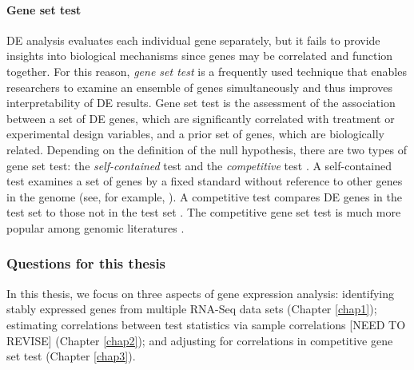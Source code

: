 \paragraph*{Gene set test}
DE analysis evaluates each individual gene separately, but it fails to provide insights into
biological mechanisms since genes may be correlated and function together. %
For this reason, \textit{gene set test} is a frequently used technique that enables
researchers to examine an ensemble of genes simultaneously and thus improves interpretability of DE
results. Gene set test is the assessment of
the association between a set of DE genes, which are significantly correlated with
treatment or experimental design variables, and a prior set of genes, which are biologically
related. Depending on the definition of the null hypothesis, there are two types of gene set test:
the \textit{self-contained} test and the \textit{competitive} test \citep{goeman2007analyzing}. A
self-contained test examines a set of genes by a fixed standard without reference to other genes in
the genome (see, for example, \cite{goeman2004global,goeman2005testing, huang2013gene,
	tsai2009multivariate, wu2010roast}). A competitive test compares DE
genes in the test set to those not in the test set
\citep{tian2005discovering,wu2012camera,yaari2013quantitative}. The competitive gene set test is
much more popular among genomic literatures \citep{gatti2010heading,goeman2007analyzing}.  




\subsubsection{Questions for this thesis}
In this thesis, we focus on three aspects of gene expression analysis: identifying stably
expressed genes from multiple RNA-Seq data sets (Chapter \ref{chap1}); estimating correlations
between test statistics via sample
correlations [NEED TO REVISE] (Chapter \ref{chap2}); and adjusting for correlations in competitive 
gene set test
(Chapter \ref{chap3}).

